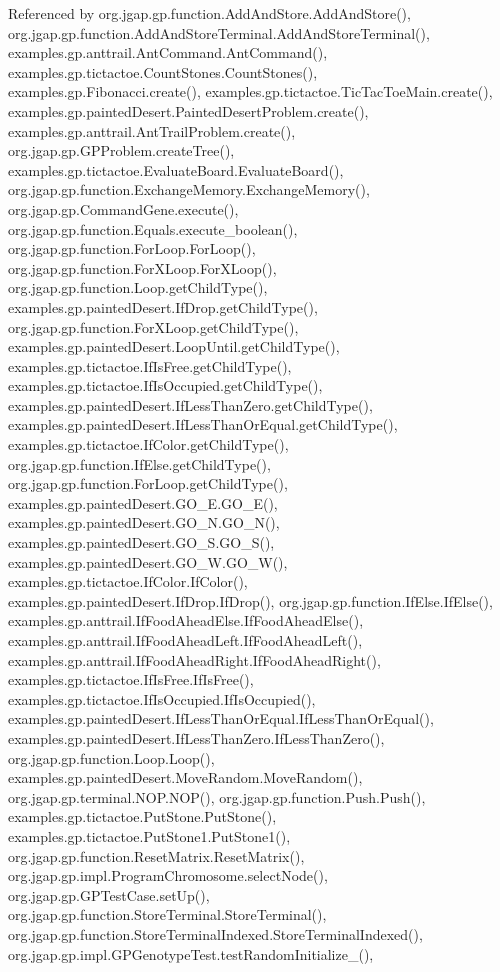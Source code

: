 Referenced by org.\-jgap.\-gp.\-function.\-Add\-And\-Store.\-Add\-And\-Store(), org.\-jgap.\-gp.\-function.\-Add\-And\-Store\-Terminal.\-Add\-And\-Store\-Terminal(), examples.\-gp.\-anttrail.\-Ant\-Command.\-Ant\-Command(), examples.\-gp.\-tictactoe.\-Count\-Stones.\-Count\-Stones(), examples.\-gp.\-Fibonacci.\-create(), examples.\-gp.\-tictactoe.\-Tic\-Tac\-Toe\-Main.\-create(), examples.\-gp.\-painted\-Desert.\-Painted\-Desert\-Problem.\-create(), examples.\-gp.\-anttrail.\-Ant\-Trail\-Problem.\-create(), org.\-jgap.\-gp.\-G\-P\-Problem.\-create\-Tree(), examples.\-gp.\-tictactoe.\-Evaluate\-Board.\-Evaluate\-Board(), org.\-jgap.\-gp.\-function.\-Exchange\-Memory.\-Exchange\-Memory(), org.\-jgap.\-gp.\-Command\-Gene.\-execute(), org.\-jgap.\-gp.\-function.\-Equals.\-execute\-\_\-boolean(), org.\-jgap.\-gp.\-function.\-For\-Loop.\-For\-Loop(), org.\-jgap.\-gp.\-function.\-For\-X\-Loop.\-For\-X\-Loop(), org.\-jgap.\-gp.\-function.\-Loop.\-get\-Child\-Type(), examples.\-gp.\-painted\-Desert.\-If\-Drop.\-get\-Child\-Type(), org.\-jgap.\-gp.\-function.\-For\-X\-Loop.\-get\-Child\-Type(), examples.\-gp.\-painted\-Desert.\-Loop\-Until.\-get\-Child\-Type(), examples.\-gp.\-tictactoe.\-If\-Is\-Free.\-get\-Child\-Type(), examples.\-gp.\-tictactoe.\-If\-Is\-Occupied.\-get\-Child\-Type(), examples.\-gp.\-painted\-Desert.\-If\-Less\-Than\-Zero.\-get\-Child\-Type(), examples.\-gp.\-painted\-Desert.\-If\-Less\-Than\-Or\-Equal.\-get\-Child\-Type(), examples.\-gp.\-tictactoe.\-If\-Color.\-get\-Child\-Type(), org.\-jgap.\-gp.\-function.\-If\-Else.\-get\-Child\-Type(), org.\-jgap.\-gp.\-function.\-For\-Loop.\-get\-Child\-Type(), examples.\-gp.\-painted\-Desert.\-G\-O\-\_\-\-E.\-G\-O\-\_\-\-E(), examples.\-gp.\-painted\-Desert.\-G\-O\-\_\-\-N.\-G\-O\-\_\-\-N(), examples.\-gp.\-painted\-Desert.\-G\-O\-\_\-\-S.\-G\-O\-\_\-\-S(), examples.\-gp.\-painted\-Desert.\-G\-O\-\_\-\-W.\-G\-O\-\_\-\-W(), examples.\-gp.\-tictactoe.\-If\-Color.\-If\-Color(), examples.\-gp.\-painted\-Desert.\-If\-Drop.\-If\-Drop(), org.\-jgap.\-gp.\-function.\-If\-Else.\-If\-Else(), examples.\-gp.\-anttrail.\-If\-Food\-Ahead\-Else.\-If\-Food\-Ahead\-Else(), examples.\-gp.\-anttrail.\-If\-Food\-Ahead\-Left.\-If\-Food\-Ahead\-Left(), examples.\-gp.\-anttrail.\-If\-Food\-Ahead\-Right.\-If\-Food\-Ahead\-Right(), examples.\-gp.\-tictactoe.\-If\-Is\-Free.\-If\-Is\-Free(), examples.\-gp.\-tictactoe.\-If\-Is\-Occupied.\-If\-Is\-Occupied(), examples.\-gp.\-painted\-Desert.\-If\-Less\-Than\-Or\-Equal.\-If\-Less\-Than\-Or\-Equal(), examples.\-gp.\-painted\-Desert.\-If\-Less\-Than\-Zero.\-If\-Less\-Than\-Zero(), org.\-jgap.\-gp.\-function.\-Loop.\-Loop(), examples.\-gp.\-painted\-Desert.\-Move\-Random.\-Move\-Random(), org.\-jgap.\-gp.\-terminal.\-N\-O\-P.\-N\-O\-P(), org.\-jgap.\-gp.\-function.\-Push.\-Push(), examples.\-gp.\-tictactoe.\-Put\-Stone.\-Put\-Stone(), examples.\-gp.\-tictactoe.\-Put\-Stone1.\-Put\-Stone1(), org.\-jgap.\-gp.\-function.\-Reset\-Matrix.\-Reset\-Matrix(), org.\-jgap.\-gp.\-impl.\-Program\-Chromosome.\-select\-Node(), org.\-jgap.\-gp.\-G\-P\-Test\-Case.\-set\-Up(), org.\-jgap.\-gp.\-function.\-Store\-Terminal.\-Store\-Terminal(), org.\-jgap.\-gp.\-function.\-Store\-Terminal\-Indexed.\-Store\-Terminal\-Indexed(), org.\-jgap.\-gp.\-impl.\-G\-P\-Genotype\-Test.\-test\-Random\-Initialize\-\_(), 